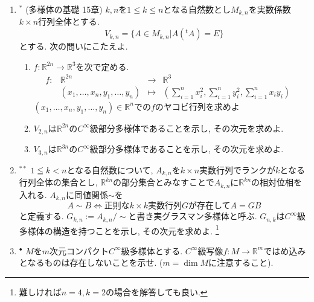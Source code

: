 \documentclass[dvipdfmx,a4paper,11pt]{article}
\newcommand{\R}{\mathbb{R}}
\theoremstyle{definition}
\begin{document}
\begin{enumerate}[label=\textbf{問}\ref*{sec-manifold}.\arabic*]
\item $^*$ (多様体の基礎 15章) $k,n$を$1 \le k \le n$となる自然数とし$M_{k, n}$を実数係数$k \times n$行列全体とする.
$$
V_{k,n}= \{ A \in M_{k, n}| A ({}^{t}A) = E\}
$$
とする. 次の問いにこたえよ.
	\begin{enumerate}
	     \setlength{\parskip}{0cm}
  \setlength{\itemsep}{0pt} 
	\item $f : \R^{2n} \rightarrow \R^3$を次で定める.
$$
\begin{array}{ccccc}
f: &\R^{2n}& \rightarrow & \R^{3} & \\
&(x_{1}, \ldots, x_n, y_1, \ldots, y_n) & \longmapsto & 
(\sum_{i=1}^{n} x_{i}^{2}, \sum_{i=1}^{n} y_{i}^{2}, \sum_{i=1}^{n} x_{i}y_{i})&
\end{array}
$$
	$(x_{1}, \ldots, x_n, y_1, \ldots, y_n) \in \R^n$での$f$のヤコビ行列を求めよ
	\item $V_{2,n}$は$\R^{2n}$の$C^{\infty}$級部分多様体であることを示し, その次元を求めよ.
	\item$V_{3,n}$は$\R^{3n}$の$C^{\infty}$級部分多様体であることを示し, その次元を求めよ.
	\end{enumerate}


\item$^{**}$ $1 \leqq k < n$となる自然数について, 
$A_{k, n}$を$k \times n$実数行列でランクが$k$となる行列全体の集合とし, $\R^{kn}$の部分集合とみなすことで$A_{k,n}$に$\R^{kn}$の相対位相を入れる. 
$A_{k, n}$に同値関係$\sim$を
$$
	A \sim B \Leftrightarrow \text{正則な$k \times k$実数行列$G$が存在して$A = GB$}
$$
と定義する. $G_{k,n}:= A_{k, n}/\sim$と書き実グラスマン多様体と呼ぶ. $G_{n,k}$は$C^{\infty}$級多様体の構造を持つことを示し, その次元を求めよ. \footnote{難しければ$n=4, k=2$の場合を解答しても良い.}


\item $^\bullet$ $M$を$m$次元コンパクト$C^{\infty}$級多様体とする. $C^{\infty}$級写像$f: M \rightarrow \R^{m}$ではめ込みとなるものは存在しないことを示せ. ($m = \dim M$に注意すること).


\end{enumerate}
\end{document}
